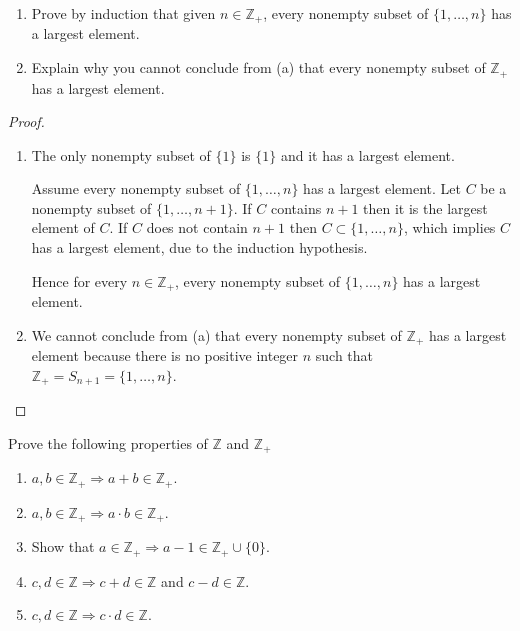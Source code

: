 \begin{exercise}\label{chapter1:section4:exercise4}
    \begin{enumerate}[label={(\alph*)}]
        \item Prove by induction that given $n\in\mathbb{Z}_{+}$, every nonempty subset of $\{ 1,\ldots,n \}$ has a largest element.
        \item Explain why you cannot conclude from (a) that every nonempty subset of $\mathbb{Z}_{+}$ has a largest element.
    \end{enumerate}
\end{exercise}

\begin{proof}
    \begin{enumerate}[label={(\alph*)}]
        \item The only nonempty subset of $\{ 1 \}$ is $\{ 1 \}$ and it has a largest element.

              Assume every nonempty subset of $\{ 1,\ldots,n \}$ has a largest element. Let $C$ be a nonempty subset of $\{ 1, \ldots, n+1 \}$. If $C$ contains $n + 1$ then it is the largest element of $C$. If $C$ does not contain $n + 1$ then $C\subset \{ 1,\ldots, n \}$, which implies $C$ has a largest element, due to the induction hypothesis.

              Hence for every $n\in\mathbb{Z}_{+}$, every nonempty subset of $\{ 1, \ldots,n \}$ has a largest element.
        \item We cannot conclude from (a) that every nonempty subset of $\mathbb{Z}_{+}$ has a largest element because there is no positive integer $n$ such that $\mathbb{Z}_{+} = S_{n+1} = \{ 1,\ldots,n \}$.
    \end{enumerate}
\end{proof}

\begin{exercise}\label{chapter1:section4:exercise5}
    Prove the following properties of $\mathbb{Z}$ and $\mathbb{Z}_{+}$
    \begin{enumerate}[label={(\alph*)}]
        \item $a, b\in\mathbb{Z}_{+}\Rightarrow a + b\in\mathbb{Z}_{+}$.
        \item $a, b\in\mathbb{Z}_{+} \Rightarrow a\cdot b\in\mathbb{Z}_{+}$.
        \item Show that $a\in\mathbb{Z}_{+} \Rightarrow a - 1\in \mathbb{Z}_{+}\cup\{ 0 \}$.
        \item $c, d\in\mathbb{Z}\Rightarrow c + d\in\mathbb{Z}$ and $c - d\in\mathbb{Z}$.
        \item $c, d\in\mathbb{Z}\Rightarrow c\cdot d\in \mathbb{Z}$.
    \end{enumerate}
\end{exercise}

